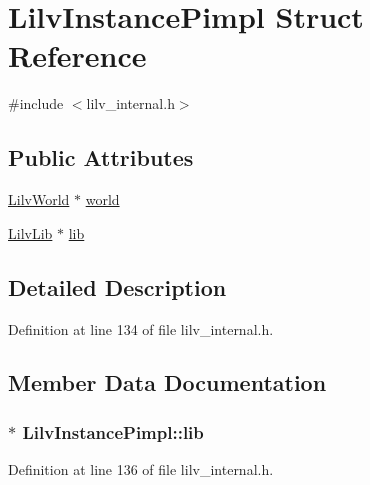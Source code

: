 \hypertarget{struct_lilv_instance_pimpl}{}\section{Lilv\+Instance\+Pimpl Struct Reference}
\label{struct_lilv_instance_pimpl}


{\ttfamily \#include $<$lilv\+\_\+internal.\+h$>$}

\subsection*{Public Attributes}
\begin{DoxyCompactItemize}
\item 
\hyperlink{lilv_8h_a91c1745aa6ffca2b6b87c56df6c5ab86}{Lilv\+World} $\ast$ \hyperlink{struct_lilv_instance_pimpl_a98074ac20d6ac57b1ac2d968984baaff}{world}
\item 
\hyperlink{struct_lilv_lib}{Lilv\+Lib} $\ast$ \hyperlink{struct_lilv_instance_pimpl_a4756203a0f1cddc8c3376eed8b7cc0f8}{lib}
\end{DoxyCompactItemize}


\subsection{Detailed Description}


Definition at line 134 of file lilv\+\_\+internal.\+h.



\subsection{Member Data Documentation}
\subsubsection[{\texorpdfstring{lib}{lib}}]{$\ast$ Lilv\+Instance\+Pimpl\+::lib}\hypertarget{struct_lilv_instance_pimpl_a4756203a0f1cddc8c3376eed8b7cc0f8}{}\label{struct_lilv_instance_pimpl_a4756203a0f1cddc8c3376eed8b7cc0f8}


Definition at line 136 of file lilv\+\_\+internal.\+h.

